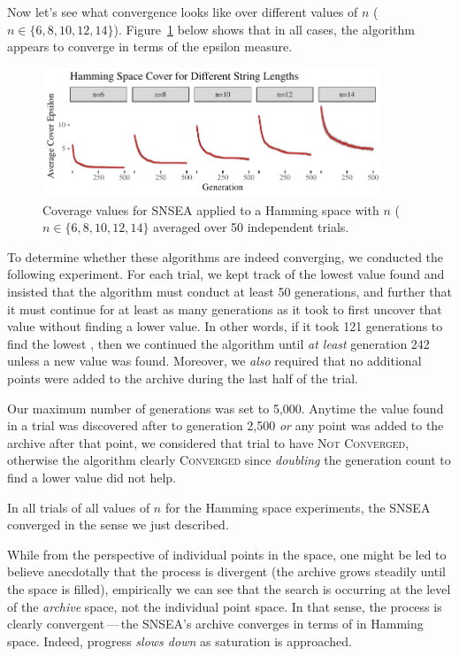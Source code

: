 \documentclass[twoside]{article}
\begin{document}
Now let's see what  convergence looks like over different values of $n$ ($n\in\{6, 8, 10, 12, 14\}$).  Figure~\ref{fig:hamming:nopop:sm} below shows that in all cases, the algorithm appears to converge in terms of the  epsilon measure.
%
\begin{figure}[h]
  \center\includegraphics[width=0.9\textwidth]{Figures/hamming-500sm-NOPOP.pdf}
  \caption{\label{fig:hamming:nopop:sm} Coverage values for SNSEA applied to a Hamming space with $n$ ($n\in\{6, 8, 10, 12, 14\}$ averaged over 50 independent trials.}
\end{figure}

To determine whether these algorithms are indeed converging, we conducted the following experiment.  For each trial, we kept track of the lowest  value found and insisted that the algorithm must conduct at least 50 generations, and further that it must continue for at least as many generations as it took to first uncover that value without finding a lower value.  In other words, if it took 121 generations to find the lowest , then we continued the algorithm until \emph{at least} generation 242 unless a new  value was found.  Moreover, we \emph{also} required that no additional points were added to the archive during the last half of the trial.

Our maximum number of generations was set to 5,000.  Anytime the  value found in a trial was discovered after to generation 2,500 \emph{or} any point was added to the archive after that point, we considered that trial to have \textsc{Not Converged}, otherwise the algorithm clearly \textsc{Converged} since \emph{doubling} the generation count to find a lower value did not help.  

In all trials of all values of $n$  for the Hamming space experiments, the SNSEA converged in the sense we just described.

While from the perspective of individual points in the space, one might be led to believe anecdotally that the process is divergent (the archive grows steadily until the space is filled), empirically we can see that the search is occurring at the level of the \emph{archive} space, not the individual point space.  In that sense, the process is clearly convergent\,---\,the SNSEA's archive converges in terms of \emph{} in Hamming space.  Indeed, progress \emph{slows down} as saturation is approached.
\end{document}
